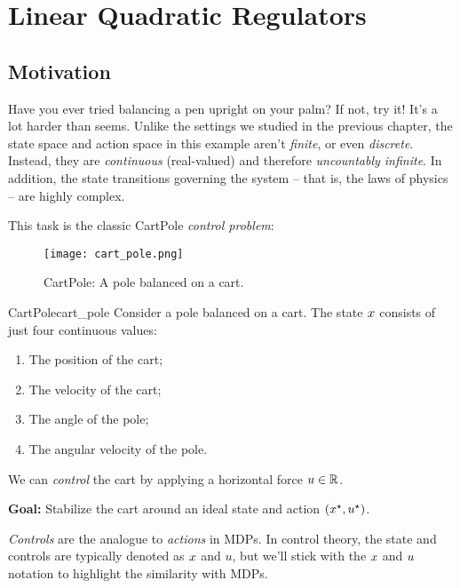 \documentclass[\main/main]{subfiles}
\begin{document}
    
\tableofcontents

\chapter[LQR]{Linear Quadratic Regulators}

\section{Motivation}

Have you ever tried balancing a pen upright on your palm?
If not, try it! It's a lot harder than seems.
Unlike the settings we studied in the previous chapter,
the state space and action space in this example aren't \emph{finite}, or even \emph{discrete}.
Instead, they are \emph{continuous} (real-valued) and therefore \emph{uncountably infinite}.
In addition, the state transitions governing the system -- that is, the laws of physics --
are highly complex.

This task is the classic CartPole \emph{control problem}:

\begin{figure}[h]
    \centering
    \texttt{[image: cart\_pole.png]}
    \caption{CartPole: A pole balanced on a cart.}
    \label{fig:cart_pole}
\end{figure}

\begin{example}{CartPole}{cart_pole}
    Consider a pole balanced on a cart.
    The state $x$ consists of just four continuous values:

    \begin{enumerate}
        \item The position of the cart;
        \item The velocity of the cart;
        \item The angle of the pole;
        \item The angular velocity of the pole.
    \end{enumerate}

    We can \emph{control} the cart by applying a horizontal force $u \in \mathbb{R}$.

    \textbf{Goal:} Stabilize the cart around an ideal state and action $(x^\star, u^\star)$.
\end{example}

\emph{Controls} are the analogue to \emph{actions} in MDPs. In control theory, the state and controls are typically denoted as
$x$ and $u$, but we'll stick with the $x$ and $u$ notation to highlight the
similarity with MDPs.
\end{document}

